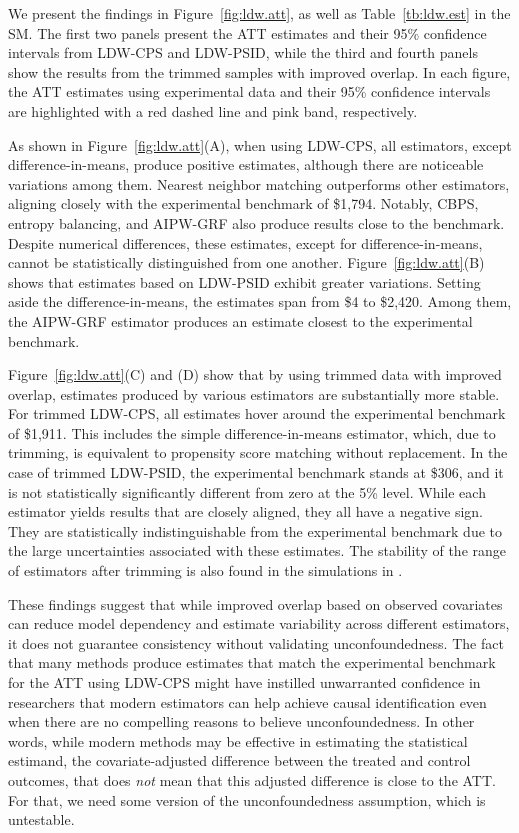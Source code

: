 \documentclass[letterpaper,12pt,leqno]{article}
\begin{document}
We present the findings in Figure~\ref{fig:ldw.att}, as well as Table~\ref{tb:ldw.est} in the SM. The first two panels present the ATT estimates and their 95\% confidence intervals from LDW-CPS and LDW-PSID, while the third and fourth panels show the results from the trimmed samples with improved overlap. In each figure, the ATT estimates using experimental data and their 95\% confidence intervals are highlighted with a red dashed line and pink band, respectively.

As shown in Figure~\ref{fig:ldw.att}(A), when using LDW-CPS, all estimators, except difference-in-means, produce positive estimates, although there are noticeable variations among them. Nearest neighbor matching outperforms other estimators, aligning closely with the experimental benchmark of \$1,794. Notably, CBPS, entropy balancing, and  AIPW-GRF also produce results close to the benchmark. Despite numerical differences, these estimates, except for difference-in-means, cannot be statistically distinguished from one another. Figure~\ref{fig:ldw.att}(B) shows that estimates based on LDW-PSID exhibit greater variations. Setting aside the difference-in-means, the estimates span from \$4 to \$2,420. Among them, the AIPW-GRF estimator produces an estimate closest to the experimental benchmark.

Figure~\ref{fig:ldw.att}(C) and (D) show that by using trimmed data with improved overlap, estimates produced by various estimators are substantially more stable. For trimmed LDW-CPS, all estimates hover around the experimental benchmark of \$1,911. This includes the simple difference-in-means estimator, which, due to trimming, is equivalent to propensity score matching without replacement. In the case of trimmed LDW-PSID, the experimental benchmark stands at \$306, and it is not statistically significantly different from zero at the 5\% level. While each estimator yields results that are closely aligned, they all have a negative sign. They are statistically indistinguishable from the experimental benchmark due to the large uncertainties associated with these estimates. The stability of the range of estimators after trimming is also found in the simulations in \citet{athey2021using}.

These findings suggest that while improved overlap based on observed covariates can reduce model dependency and estimate variability across different estimators, it does not guarantee consistency without validating unconfoundedness. The fact that many methods produce estimates that match the experimental benchmark for the ATT using LDW-CPS might have instilled unwarranted confidence in researchers that modern estimators can help achieve causal identification even when there are no compelling reasons to believe unconfoundedness. In other words, while modern methods may be effective in estimating the statistical estimand, the  covariate-adjusted difference between the treated and control outcomes, that does {\it not} mean that this adjusted difference is close to the ATT. For that, we need some version of the unconfoundedness assumption, which is untestable.
\end{document}
